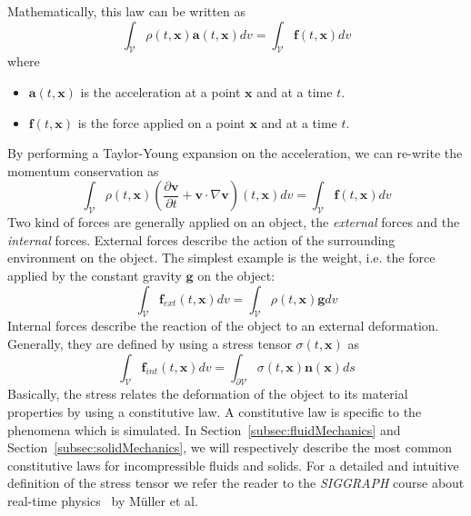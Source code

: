 Mathematically, this law can be written as
\begin{equation}
\displaystyle 
\int_{\mathcal{V}} 
\rho(t,\mathbf{x})\mathbf{a}(t,\mathbf{x}) dv 
= 
\int_{\mathcal{V}} \mathbf{f}(t,\mathbf{x}) dv
\end{equation}
where
\begin{itemize}
	\item $\mathbf{a}(t,\mathbf{x})$ is the acceleration at a point $\mathbf{x}$ and at a time $t$.
		\item $\mathbf{f}(t,\mathbf{x})$ is the force applied on a point $\mathbf{x}$ and at a time $t$.
\end{itemize}
By performing a Taylor-Young expansion on the acceleration, we can re-write the momentum conservation as
\begin{equation}
\label{eq:momentumConservation}
\displaystyle 
\int_{\mathcal{V}} 
\rho(t,\mathbf{x}) \left( \frac{\partial\mathbf{v}}{\partial t} + \mathbf{v} \cdot \nabla \mathbf{v} \right)(t,\mathbf{x}) dv 
= 
\int_{\mathcal{V}} \mathbf{f}(t,\mathbf{x}) dv
\end{equation}
Two kind of forces are generally applied on an object, the \emph{external} forces and the \emph{internal} forces.
External forces describe the action of the surrounding environment on the object. 
The simplest example is the weight, i.e. the force applied by the constant gravity $\mathbf{g}$ on the object:
\begin{equation}
\label{eq:externalForces}
\displaystyle \int_{\mathcal{V}} \mathbf{f}_{ext}(t,\mathbf{x})dv = \int_{\mathcal{V}} \rho(t,\mathbf{x}) \mathbf{g} dv
\end{equation}
Internal forces describe the reaction of the object to an external deformation.
Generally, they are defined by using a stress tensor $\sigma(t,\mathbf{x})$ as 
\begin{equation}
\displaystyle 
\int_{\mathcal{V}} \mathbf{f}_{int}(t,\mathbf{x}) dv 
= \int_{\partial \mathcal{V}} \sigma(t,\mathbf{x}) \mathbf{n}(\mathbf{x}) ds
\end{equation}
Basically, the stress relates the deformation of the object to its material properties by using a constitutive law.
A constitutive law is specific to the phenomena which is simulated.
In Section~\ref{subsec:fluidMechanics} and Section~\ref{subsec:solidMechanics}, we will respectively describe the most common constitutive laws for incompressible fluids and solids.
For a detailed and intuitive definition of the stress tensor we refer the reader to the \emph{SIGGRAPH} course about real-time physics~\cite{Muller2008} by M\"{u}ller et al.

